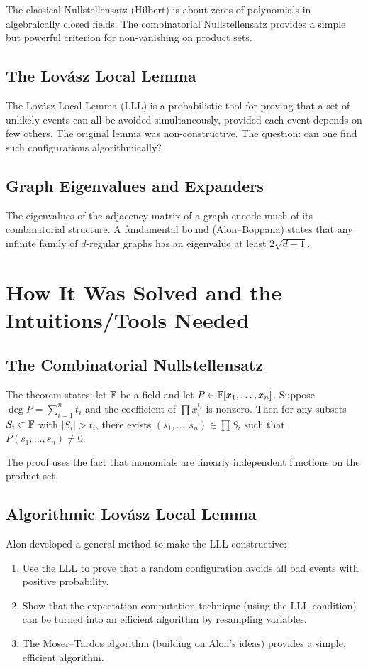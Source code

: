 The classical Nullstellensatz (Hilbert) is about zeros of polynomials in algebraically closed fields. The combinatorial Nullstellensatz provides a simple but powerful criterion for non-vanishing on product sets.

\subsection{The Lov\'asz Local Lemma}

The Lov\'asz Local Lemma (LLL) is a probabilistic tool for proving that a set of unlikely events can all be avoided simultaneously, provided each event depends on few others. The original lemma was non-constructive. The question: can one find such configurations algorithmically?

\subsection{Graph Eigenvalues and Expanders}

The eigenvalues of the adjacency matrix of a graph encode much of its combinatorial structure. A fundamental bound (Alon--Boppana) states that any infinite family of $d$-regular graphs has an eigenvalue at least $2\sqrt{d-1}$.

\section{How It Was Solved and the Intuitions/Tools Needed}

\subsection{The Combinatorial Nullstellensatz}

The theorem states: let $\mathbb{F}$ be a field and let $P \in \mathbb{F}[x_1, \ldots, x_n]$. Suppose $\deg P = \sum_{i=1}^n t_i$ and the coefficient of $\prod x_i^{t_i}$ is nonzero. Then for any subsets $S_i \subset \mathbb{F}$ with $|S_i| > t_i$, there exists $(s_1, \ldots, s_n) \in \prod S_i$ such that $P(s_1, \ldots, s_n) \neq 0$.

The proof uses the fact that monomials are linearly independent functions on the product set.

\subsection{Algorithmic Lov\'asz Local Lemma}

Alon developed a general method to make the LLL constructive:
\begin{enumerate}
    \item Use the LLL to prove that a random configuration avoids all bad events with positive probability.
    \item Show that the expectation-computation technique (using the LLL condition) can be turned into an efficient algorithm by resampling variables.
    \item The Moser--Tardos algorithm (building on Alon's ideas) provides a simple, efficient algorithm.
\end{enumerate}


